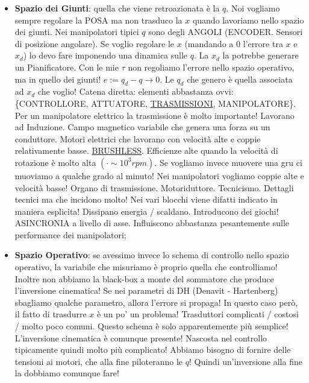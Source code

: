 \begin{itemize}

\item{\textbf{Spazio dei Giunti}}: quella che viene retroazionata è la $q$. Noi vogliamo sempre regolare la POSA ma non trasduco la $x$ quando lavoriamo nello spazio dei giunti. Nei manipolatori tipici $q$ sono degli ANGOLI (ENCODER. Sensori di posizione angolare). Se voglio regolare le $x$ (mandando a 0 l'errore tra $x$ e $x_d$) lo devo fare imponendo una dinamica sulle $q$. La $x_d$ la potrebbe generare un Pianificatore. Con le mie $\tau$ non regoliamo l'errore nello spazio operativo, ma in quello dei giunti! $e := q_d-q\to 0$. Le $q_d$ che genero è quella associata ad $x_d$ che voglio! Catena diretta: elementi abbastanza ovvi: \{CONTROLLORE, ATTUATORE, \underline{TRASMISSIONI}, MANIPOLATORE\}. Per un manipolatore elettrico la trasmissione è molto importante! Lavorano ad Induzione. Campo magnetico variabile che genera una forza su un conduttore. Motori elettrici che lavorano con velocità alte e coppie relativamente basse. \underline{BRUSHLESS}. Efficienze alte quando la velocità di rotazione è molto alta $(\mathord{\cdot}\sim 10^3 rpm)$. Se vogliamo invece muovere una gru ci muoviamo a qualche grado al minuto! Nei manipolatori vogliamo coppie alte e velocità basse! Organo di trasmissione. Motoriduttore. Tecnicismo. Dettagli tecnici ma che incidono molto! Nei vari blocchi viene difatti indicato in maniera esplicita! Dissipano energia / scaldano. Introducono dei giochi! ASINCRONIA a livello di asse. Influiscono abbastanza pesantemente sulle performance dei manipolatori;

\item{\textbf{Spazio Operativo}}: se avessimo invece lo schema di controllo nello spazio operativo, la variabile che misuriamo è proprio quella che controlliamo! Inoltre non abbiamo la black-box a monte del sommatore che produce l'inversione cinematica! Se nei parametri di DH (Denavit - Hartenberg) sbagliamo qualche parametro, allora l'errore si propaga! In questo caso però, il fatto di trasdurre $x$ è un po' un problema! Trasduttori complicati / costosi / molto poco comuni. Questo schema è solo apparentemente più semplice! L'inversione cinematica è comunque presente! Nascosta nel controllo tipicamente quindi molto più complicato! Abbiamo bisogno di fornire delle tensioni ai motori, che alla fine piloteranno le $q$! Quindi un'inversione alla fine la dobbiamo comunque fare! 

\end{itemize}

